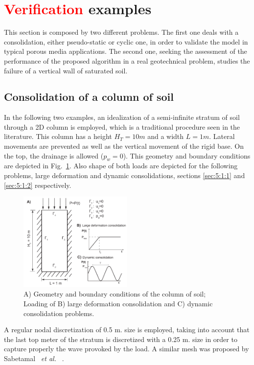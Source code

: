 \documentclass[twocolumn]{svjour3}          %
\newcommand{\etal}{
  \textit{et al.}
}
\begin{document}
\section{\textcolor{red}{Verification} examples}
\label{sec:5}
This section is composed by two different problems. The first one deals with a consolidation, either pseudo-static or cyclic one, in order to validate the model in typical porous media applications. The second one, seeking the assessment of the performance of the proposed algorithm in a real geotechnical problem, studies the failure of a vertical wall of saturated soil.

\subsection{Consolidation of a column of soil}
\label{sec:5:1}
In the following two examples, an idealization of a semi-infinite stratum of soil through a 2D column is employed, which is a traditional procedure seen in the literature. This column has a height $H_T=10m$ and a width $L=1m$. Lateral movements are prevented as well as the vertical movement of the rigid base. On the top, the drainage is allowed ($p_w=0$). This geometry and boundary conditions are depicted in Fig.~\ref{fig:1}. Also shape of both loads are depicted for the following problems, large deformation and dynamic consolidations, sections \ref{sec:5:1:1} and \ref{sec:5:1:2} respectively.

\begin{figure}
  \includegraphics[width=0.5\textwidth]{Fig/col.pdf}
\caption{A) Geometry and boundary conditions of the column of soil;  Loading of B) large deformation consolidation and C) dynamic consolidation problems.}
\label{fig:1}       %
\end{figure}

A regular nodal discretization of 0.5 m. size is employed, taking into account that the last top meter of the stratum is discretized with a 0.25 m. size in order to capture properly the wave provoked by the load. A similar mesh was proposed by Sabetamal~\etal~\cite{Sabetamal:2015}. 
\end{document}
